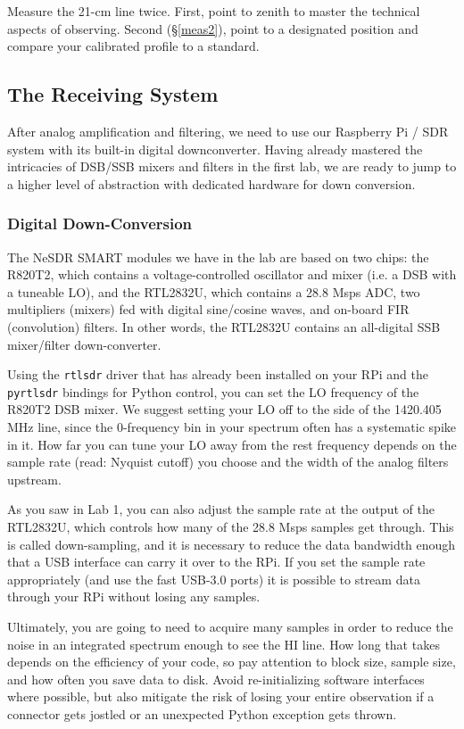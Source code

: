 \documentclass[11pt,preprint]{aastex}
\begin{document}
Measure the 21-cm line twice.
First, point to zenith to master the technical aspects of observing.
Second (\S \ref{meas2}), point to a designated position and compare your
calibrated profile to a standard.


\subsection{The Receiving System}

\noindent
After analog amplification and filtering, we need to use our
Raspberry Pi / SDR system with its built-in digital downconverter.
Having already mastered the intricacies of DSB/SSB mixers and filters in the
first lab, we are ready to jump to a higher level of 
abstraction with dedicated hardware for down conversion.

\subsubsection{Digital Down-Conversion}

\noindent
The NeSDR SMART modules we have in the lab are based on two chips:
the R820T2, which contains a voltage-controlled oscillator and mixer
(i.e. a DSB with a tuneable LO), and the RTL2832U, which contains
a 28.8 Msps ADC, two multipliers (mixers) fed with digital sine/cosine
waves, and on-board FIR (convolution) filters. 
In other words, the RTL2832U contains an all-digital SSB mixer/filter
down-converter.

Using the {\tt rtlsdr} driver that has already been installed on your
RPi and the {\tt pyrtlsdr} bindings for Python control, you can set
the LO frequency of the R820T2 DSB mixer.
We suggest setting your LO off to the side of the 1420.405 MHz line,
since the 0-frequency bin in your spectrum often has a
systematic spike in it. How far you can tune your LO away from the
rest frequency depends on the sample rate (read: Nyquist cutoff) you
choose and the width of the analog filters upstream.

As you saw in Lab 1, you can also adjust the
sample rate at the output of the RTL2832U, which controls how many of
the 28.8 Msps samples get through. This is called down-sampling, and
it is necessary to reduce the data bandwidth enough that a
USB interface can carry it over to the RPi. If you set the sample
rate appropriately (and use the fast USB-3.0 ports)
it is possible to stream data through your RPi without losing any samples.

Ultimately, you are going to need to acquire many samples in order
to reduce the noise in an integrated spectrum enough to see
the HI line. How long that takes depends on the efficiency
of your code, so pay attention to block size, sample size,
and how often you save data to disk. Avoid re-initializing software 
interfaces where possible, but also mitigate the risk of losing your
entire observation if a connector gets jostled or an unexpected Python
exception gets thrown.
\end{document}
